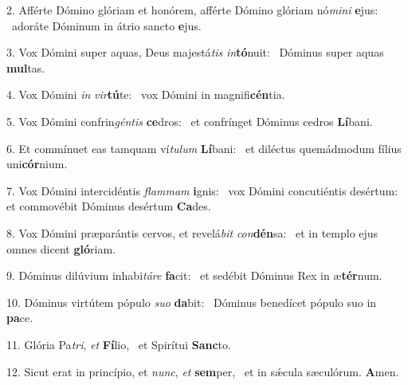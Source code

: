 2. Afférte Dómino glóriam et honórem, afférte Dómino glóriam nó\textit{mi}\textit{ni} \textbf{e}jus: \ast\  adoráte Dóminum in átrio sancto \textbf{e}jus.\

3. Vox Dómini super aquas, Deus majestá\textit{tis} \textit{in}\textbf{tó}nuit: \ast\  Dóminus super aquas \textbf{mul}tas.\

4. Vox Dómini \textit{in} \textit{vir}\textbf{tú}te: \ast\  vox Dómini in magnifi\textbf{cén}tia.\

5. Vox Dómini confrin\textit{gén}\textit{tis} \textbf{ce}dros: \ast\  et confrínget Dóminus cedros \textbf{Lí}bani.\

6. Et commínuet eas tamquam ví\textit{tu}\textit{lum} \textbf{Lí}bani: \ast\  et diléctus quemádmodum fílius uni\textbf{cór}nium.\

7. Vox Dómini intercidéntis \textit{flam}\textit{mam} \textbf{i}gnis: \ast\  vox Dómini concutiéntis desértum: et commovébit Dóminus desértum \textbf{Ca}des.\

8. Vox Dómini præparántis cervos, et revelá\textit{bit} \textit{con}\textbf{dén}sa: \ast\  et in templo ejus omnes dicent \textbf{gló}riam.\

9. Dóminus dilúvium inhabi\textit{tá}\textit{re} \textbf{fa}cit: \ast\  et sedébit Dóminus Rex in æ\textbf{tér}num.\

10. Dóminus virtútem pópulo \textit{su}\textit{o} \textbf{da}bit: \ast\  Dóminus benedícet pópulo suo in \textbf{pa}ce.\

11. Glória Pa\textit{tri}, \textit{et} \textbf{Fí}lio, \ast\  et Spirítui \textbf{Sanc}to.\

12. Sicut erat in princípio, et \textit{nunc}, \textit{et} \textbf{sem}per, \ast\  et in sǽcula sæculórum. \textbf{A}men.\

